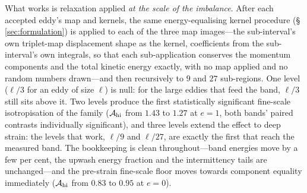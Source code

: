 \documentclass[11pt,a4paper]{article}
\begin{document}
What works is relaxation applied \emph{at the scale of the imbalance}.
After each accepted eddy's map and kernels, the same energy-equalising
kernel procedure (\S\,\ref{sec:formulation}) is applied to each of the
three map images---the sub-interval's own triplet-map displacement shape
as the kernel, coefficients from the sub-interval's own integrals, so
that each sub-application conserves the momentum components and the total
kinetic energy exactly, with no map applied and no random numbers
drawn---and then recursively to $9$ and $27$ sub-regions. One level
($\ell/3$ for an eddy of size $\ell$) is null: for the large eddies that
feed the band, $\ell/3$ still sits above it. Two levels produce the first
statistically significant fine-scale isotropisation of the family
($\mathcal A_{\rm hi}$ from $1.43$ to $1.27$ at $e=1$, both bands'
paired contrasts individually significant), and three levels extend the
effect to deep strain: the levels that work, $\ell/9$ and $\ell/27$, are
exactly the first that reach the measured band. The bookkeeping is clean
throughout---band energies move by a few per cent, the upwash energy
fraction and the intermittency tails are unchanged---and the pre-strain
fine-scale floor moves towards component equality immediately
($\mathcal A_{\rm hi}$ from $0.83$ to $0.95$ at $e=0$).
\end{document}
